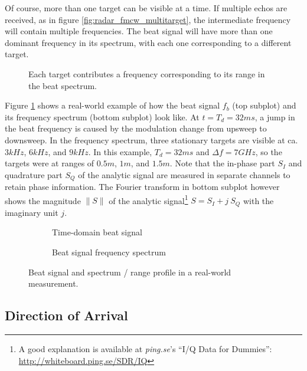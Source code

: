 Of course, more than one target can be visible at a time. If multiple
echos are received, as in figure \ref{fig:radar_fmcw_multitarget}, the intermediate frequency will
contain multiple frequencies. The beat signal will have more than one
dominant frequency in its spectrum, with each one corresponding to a
different target.

\begin{figure}[htp]
    \centering
    \label{fig:fmcw_multitarget}
    \def\svgwidth{10cm}
    
    \caption{Each target contributes a frequency corresponding to its range in the beat spectrum.}
\end{figure}

Figure \ref{fig:fmcw_multitarget} shows a real-world example of how the beat signal \(f_b\)
(top subplot) and its frequency spectrum (bottom subplot) look like. At
\(t=T_d=32ms\), a jump in the beat frequency is caused by the modulation
change from upsweep to downsweep. In the frequency spectrum, three
stationary targets are visible at ca. \(3kHz\), \(6kHz\), and \(9kHz\).
In this example, \(T_d=32ms\) and \(\Delta f=7GHz\), so the targets were
at ranges of \(0.5m\), \(1m\), and \(1.5m\). Note that the in-phase part
\(S_I\) and quadrature part \(S_Q\) of the analytic signal are measured
in separate channels to retain phase information. The Fourier transform
in bottom subplot however shows the magnitude \(\|S\|\) of the analytic
signal\footnote{A good explanation is available at \textit{ping.se}'s ``I/Q Data for Dummies'': \url{http://whiteboard.ping.se/SDR/IQ}}
\(S = S_I + j~S_Q\) with the imaginary unit \(j\).

\begin{figure}[htp]
    \centering
    \label{fig:fig_raw_beat}
    \begin{subfigure}{0.475\textwidth}
      \def\svgwidth{\linewidth} \small
      
      \caption{Time-domain beat signal}
    \end{subfigure}
    \hfill
    \begin{subfigure}{0.475\textwidth}
      \def\svgwidth{\linewidth} \small
      
      \caption{Beat signal frequency spectrum}
    \end{subfigure}
    \caption{Beat signal and spectrum / range profile in a real-world measurement.}
\end{figure}

\subsection{Direction of Arrival}\label{direction-of-arrival}


